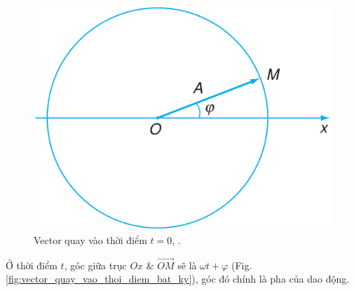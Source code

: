 \documentclass{article}
\numberwithin{equation}{section}
\begin{document}
\begin{figure}[H]
	\centering
	\includegraphics[scale=0.15]{vector_quay_vao_thoi_diem_0}
	\caption{Vector quay vào thời điểm $t = 0$, \cite[Hình 6.6, p. 33]{SGK_Vat_Ly_12_nang_cao}.}
	\label{fig:vector_quay_vao_thoi_diem_0}
\end{figure}
Ở thời điểm $t$, góc giữa trục $Ox$ \& $\overrightarrow{OM}$ sẽ là $\omega t + \varphi$ (Fig. \ref{fig:vector_quay_vao_thoi_diem_bat_ky}), góc đó chính là pha của dao động.
\end{document}
